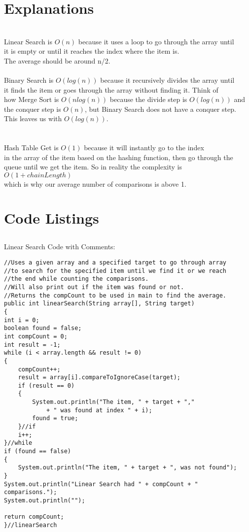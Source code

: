 \documentclass[letterpaper, 10pt]{article}
\begin{document}
\section{Explanations}
\noindent
\\
Linear Search is $O(n)$ because it uses a loop to go through the array until \\ it is empty or until it reaches the index where the item is.\\
The average should be around n/2. \\
\\
Binary Search is $O(log(n))$ because it recursively divides the array until \\
it finds the item or goes through the array without finding it. Think of \\
how Merge Sort is $O(nlog(n))$ because the divide step is $O(log(n))$ and \\
the conquer step is $O(n)$, but Binary Search does not have a conquer step. \\
This leaves us with $O(log(n))$. \\
\\
\\
Hash Table Get is $O(1)$ because it will instantly go to the index \\
in the array of the item based on the hashing function, then go through the \\
queue until we get the item. So in reality the complexity is $O(1 + chainLength)$\\
which is why our average number of comparisons is above 1.
\\

\section{Code Listings}
\noindent
\subsection{}
Linear Search Code with Comments: \\
\begin{lstlisting}
//Uses a given array and a specified target to go through array 
//to search for the specified item until we find it or we reach 
//the end while counting the comparisons.
//Will also print out if the item was found or not.
//Returns the compCount to be used in main to find the average.
public int linearSearch(String array[], String target)
{
int i = 0;
boolean found = false;
int compCount = 0;
int result = -1;
while (i < array.length && result != 0)
{
    compCount++;
    result = array[i].compareToIgnoreCase(target);
    if (result == 0)
    {
        System.out.println("The item, " + target + "," 
            + " was found at index " + i);
        found = true;
    }//if
    i++;
}//while
if (found == false)
{
    System.out.println("The item, " + target + ", was not found");
}
System.out.println("Linear Search had " + compCount + " comparisons.");
System.out.println("");

return compCount;
}//linearSearch

\end{lstlisting}
\\
\end{document}
